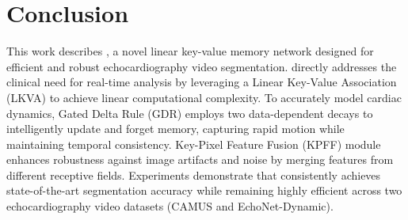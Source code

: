 \section{Conclusion}
    \label{sec:conclusion}
This work describes \mymodel, a novel linear key-value memory network designed for efficient and robust echocardiography video segmentation. 
\mymodel directly addresses the clinical need for real-time analysis by leveraging a Linear Key-Value Association (LKVA) to achieve linear computational complexity. To accurately model cardiac dynamics, Gated Delta Rule (GDR) employs two data-dependent decays to intelligently update and forget memory, capturing rapid motion while maintaining temporal consistency. Key-Pixel Feature Fusion (KPFF) module enhances robustness against image artifacts and noise by merging features from different receptive fields.
Experiments demonstrate that \mymodel consistently achieves state-of-the-art segmentation accuracy while remaining highly efficient across two echocardiography video datasets (CAMUS and EchoNet-Dynamic).